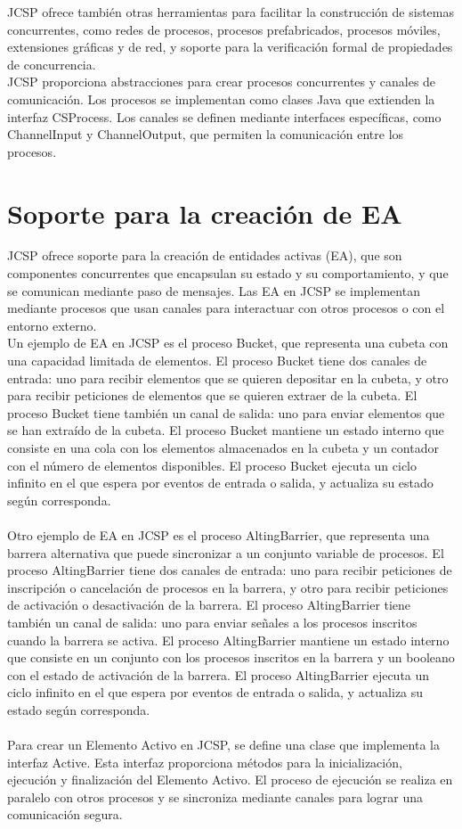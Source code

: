JCSP ofrece también otras herramientas para facilitar la construcción de sistemas concurrentes, como redes de procesos, procesos prefabricados, procesos móviles, extensiones gráficas y de red, y soporte para la verificación formal de propiedades de concurrencia.\\
JCSP proporciona abstracciones para crear procesos concurrentes y canales de comunicación. Los procesos se implementan como clases Java que extienden la interfaz CSProcess. Los canales se definen mediante interfaces específicas, como ChannelInput y ChannelOutput, que permiten la comunicación entre los procesos.

\section*{Soporte para la creación de EA}
JCSP ofrece soporte para la creación de entidades activas (EA), que son componentes concurrentes que encapsulan su estado y su comportamiento, y que se comunican mediante paso de mensajes. Las EA en JCSP se implementan mediante procesos que usan canales para interactuar con otros procesos o con el entorno externo.\\
Un ejemplo de EA en JCSP es el proceso Bucket, que representa una cubeta con una capacidad limitada de elementos. El proceso Bucket tiene dos canales de entrada: uno para recibir elementos que se quieren depositar en la cubeta, y otro para recibir peticiones de elementos que se quieren extraer de la cubeta. El proceso Bucket tiene también un canal de salida: uno para enviar elementos que se han extraído de la cubeta. El proceso Bucket mantiene un estado interno que consiste en una cola con los elementos almacenados en la cubeta y un contador con el número de elementos disponibles. El proceso Bucket ejecuta un ciclo infinito en el que espera por eventos de entrada o salida, y actualiza su estado según corresponda.\\\\
Otro ejemplo de EA en JCSP es el proceso AltingBarrier, que representa una barrera alternativa que puede sincronizar a un conjunto variable de procesos. El proceso AltingBarrier tiene dos canales de entrada: uno para recibir peticiones de inscripción o cancelación de procesos en la barrera, y otro para recibir peticiones de activación o desactivación de la barrera. El proceso AltingBarrier tiene también un canal de salida: uno para enviar señales a los procesos inscritos cuando la barrera se activa. El proceso AltingBarrier mantiene un estado interno que consiste en un conjunto con los procesos inscritos en la barrera y un booleano con el estado de activación de la barrera. El proceso AltingBarrier ejecuta un ciclo infinito en el que espera por eventos de entrada o salida, y actualiza su estado según corresponda.\\\\
Para crear un Elemento Activo en JCSP, se define una clase que implementa la interfaz Active. Esta interfaz proporciona métodos para la inicialización, ejecución y finalización del Elemento Activo. El proceso de ejecución se realiza en paralelo con otros procesos y se sincroniza mediante canales para lograr una comunicación segura.

